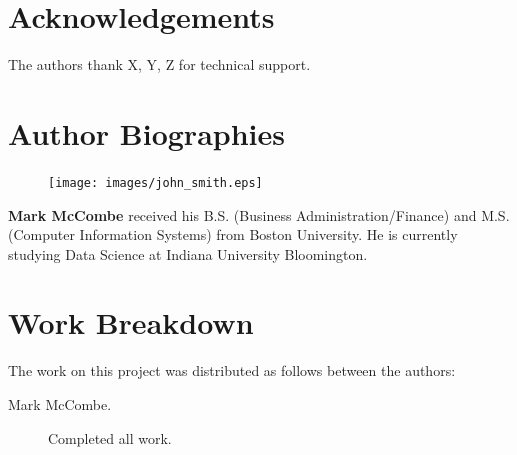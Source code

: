 \documentclass[9pt,twocolumn,twoside]{../../styles/osajnl}
\begin{document}
\section*{Acknowledgements}

The authors thank X, Y, Z for technical
support.




 
\section*{Author Biographies}
\begingroup
\setlength\intextsep{0pt}
\begin{minipage}[t][3.2cm][t]{1.0\columnwidth} %
  \begin{figure}
    \texttt{[image: images/john\_smith.eps]}
  \end{figure}
  \noindent
{\bfseries Mark McCombe} received his B.S. (Business Administration/Finance) and M.S. (Computer Information Systems) from Boston University.  He is currently studying Data Science at Indiana University Bloomington.

\end{minipage}
\endgroup

\newpage

\appendix

\section{Work Breakdown}

The work on this project was distributed as follows between the
authors:

\begin{description}

\item[Mark McCombe.] Completed all work.

\end{description}
\end{document}
